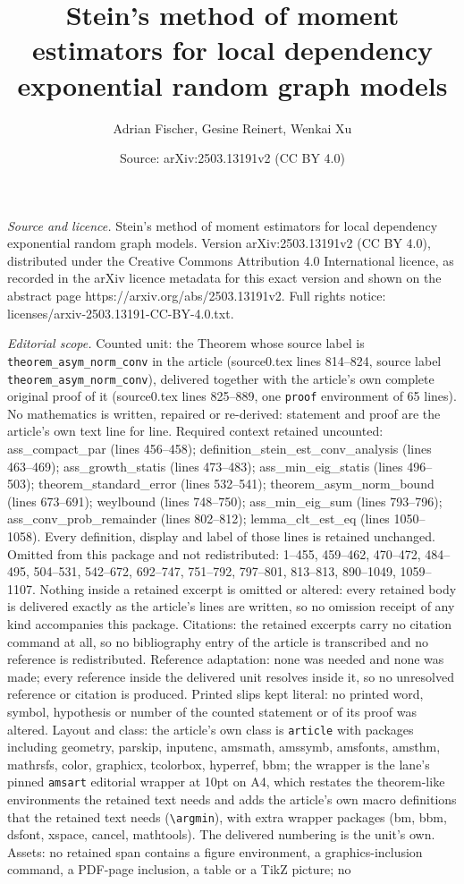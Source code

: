 \documentclass[10pt,a4paper]{amsart}
\title[Stein's method of moment estimators for local dependency exp]{Stein's method of moment estimators for local dependency exponential random graph models}
\author{Adrian Fischer, Gesine Reinert, Wenkai Xu}
\date{Source: arXiv:2503.13191v2 (CC BY 4.0)}
\begin{document}
\maketitle

\noindent\emph{Source and licence.} Stein's method of moment estimators for local dependency exponential random graph models. Version arXiv:2503.13191v2 (CC BY 4.0), distributed under the Creative Commons Attribution 4.0 International licence, as recorded in the arXiv licence metadata for this exact version and shown on the abstract page https://arxiv.org/abs/2503.13191v2. Full rights notice: licenses/arxiv-2503.13191-CC-BY-4.0.txt.\par\smallskip

\noindent\textit{Editorial scope.} Counted unit: the Theorem whose source label is \texttt{theorem\_asym\_norm\_conv} in the article (source0.tex lines 814--824, source label \texttt{theorem\_asym\_norm\_conv}), delivered together with the article's own complete original proof of it (source0.tex lines 825--889, one \texttt{proof} environment of 65 lines). No mathematics is written, repaired or re-derived: statement and proof are the article's own text line for line. Required context retained uncounted: ass\_compact\_par (lines 456--458); definition\_stein\_est\_conv\_analysis (lines 463--469); ass\_growth\_statis (lines 473--483); ass\_min\_eig\_statis (lines 496--503); theorem\_standard\_error (lines 532--541); theorem\_asym\_norm\_bound (lines 673--691); weylbound (lines 748--750); ass\_min\_eig\_sum (lines 793--796); ass\_conv\_prob\_remainder (lines 802--812); lemma\_clt\_est\_eq (lines 1050--1058). Every definition, display and label of those lines is retained unchanged. Omitted from this package and not redistributed: 1--455, 459--462, 470--472, 484--495, 504--531, 542--672, 692--747, 751--792, 797--801, 813--813, 890--1049, 1059--1107. Nothing inside a retained excerpt is omitted or altered: every retained body is delivered exactly as the article's lines are written, so no omission receipt of any kind accompanies this package. Citations: the retained excerpts carry no citation command at all, so no bibliography entry of the article is transcribed and no reference is redistributed. Reference adaptation: none was needed and none was made; every reference inside the delivered unit resolves inside it, so no unresolved reference or citation is produced. Printed slips kept literal: no printed word, symbol, hypothesis or number of the counted statement or of its proof was altered. Layout and class: the article's own class is \texttt{article} with packages including geometry, parskip, inputenc, amsmath, amssymb, amsfonts, amsthm, mathrsfs, color, graphicx, tcolorbox, hyperref, bbm; the wrapper is the lane's pinned \texttt{amsart} editorial wrapper at 10pt on A4, which restates the theorem-like environments the retained text needs and adds the article's own macro definitions that the retained text needs (\texttt{\textbackslash argmin}), with extra wrapper packages (bm, bbm, dsfont, xspace, cancel, mathtools). The delivered numbering is the unit's own. Assets: no retained span contains a figure environment, a graphics-inclusion command, a PDF-page inclusion, a table or a TikZ picture; no 
\end{document}
